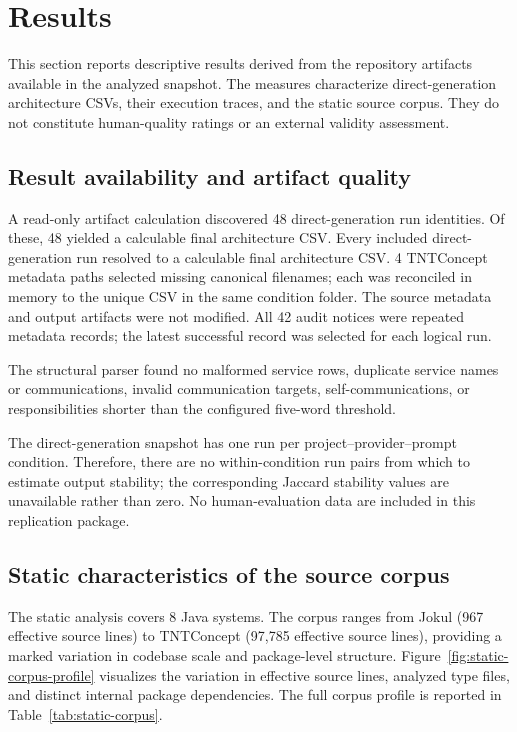\section{Results}
\label{sec:results}

This section reports descriptive results derived from the repository artifacts available in the analyzed snapshot. The measures characterize direct-generation architecture CSVs, their execution traces, and the static source corpus. They do not constitute human-quality ratings or an external validity assessment.

\subsection{Result availability and artifact quality}

A read-only artifact calculation discovered 48 direct-generation run identities. Of these, 48 yielded a calculable final architecture CSV. Every included direct-generation run resolved to a calculable final architecture CSV. 4 TNTConcept metadata paths selected missing canonical filenames; each was reconciled in memory to the unique CSV in the same condition folder. The source metadata and output artifacts were not modified. All 42 audit notices were repeated metadata records; the latest successful record was selected for each logical run.

The structural parser found no malformed service rows, duplicate service names or communications, invalid communication targets, self-communications, or responsibilities shorter than the configured five-word threshold.



The direct-generation snapshot has one run per project--provider--prompt condition. Therefore, there are no within-condition run pairs from which to estimate output stability; the corresponding Jaccard stability values are unavailable rather than zero. No human-evaluation data are included in this replication package.

\subsection{Static characteristics of the source corpus}

The static analysis covers 8 Java systems. The corpus ranges from Jokul (967 effective source lines) to TNTConcept (97,785 effective source lines), providing a marked variation in codebase scale and package-level structure. Figure~\ref{fig:static-corpus-profile} visualizes the variation in effective source lines, analyzed type files, and distinct internal package dependencies. The full corpus profile is reported in Table~\ref{tab:static-corpus}.


